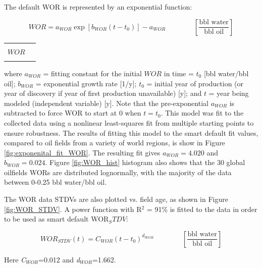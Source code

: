 \documentclass[11pt]{report}
\newcommand{\xlname}[1]{\raisebox{1pt}{\fcolorbox{light-gray}{light-gray}{\texttt{\textcolor{stanford}{\scriptsize{#1}}}}}}
\newcommand{\eqnunitfrac}[2]{\quad\quad \scriptstyle{\left[\frac{\text{#1}}{\text{#2}}\right]}}
\begin{document}
The default WOR is represented by an exponential function:

\begin{minipage}{0.8\columnwidth}\label{eq:smart_default_WOR}
\begin{fleqn}[0pt]
\begin{equation}
WOR = a_{WOR} \exp [b_{WOR} ( t - t_0 )] - a_{WOR} \quad\quad\eqnunitfrac{bbl water}{bbl oil}
\end{equation}
\end{fleqn}
\end{minipage}\hfill
\begin{minipage}{0.3\columnwidth}
        \begin{tabular}{|cl}
        & \\
        $WOR$   & \xlname{WOR}\\
        & \\
\end{tabular}
\end{minipage}
where $a_{WOR}$ = fitting constant for the initial $WOR$ in time = $t_0$ [bbl water/bbl oil]; $b_{WOR}$ = exponential growth rate [1/y]; $t_0$ = initial year of production (or year of discovery if year of first production unavailable) [y]; and $t$ = year being modeled (independent variable) [y]. Note that the pre-exponential $a_{WOR}$ is subtracted to force WOR to start at 0 when $t = t_0$. This model was fit to the collected data using a nonlinear least-squares fit from multiple starting points to ensure robustness.
The results of fitting this model to the smart default fit values, compared to oil fields from a variety of world regions, is show in Figure \ref{fig:exponenital_fit_WOR}. The resulting fit gives $a_{WOR} = 4.020$ and $b_{WOR} = 0.024$. Figure \ref{fig:WOR_hist} histogram also shows that the 30 global oilfields WORs are distributed lognormally, with the majority of the data between 0-0.25 bbl water/bbl oil. 

The WOR data STDVs are also plotted vs. field age, as shown in Figure \ref{fig:WOR_STDV}. A power function with R$^2$ = 91\% is fitted to the data in order to be used as smart default WOR$_STDV$:

\begin{equation}\label{eq:smart_default_WOR_STDV}
WOR_{STDV}(t) = C_{WOR}( t - t_0 )^{d_{WOR}} \quad\quad\eqnunitfrac{bbl water}{bbl oil}
\end{equation}

Here \emph{C$_{WOR}$}=0.012 and \emph{d$_{WOR}$}=1.662. 
\end{document}
